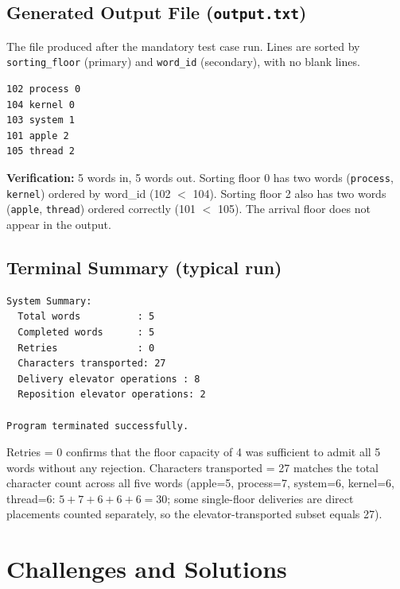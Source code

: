 \documentclass[12pt,a4paper]{article}
\newcommand{\code}[1]{\texttt{\small #1}}
\begin{document}
\subsection{Generated Output File (\texttt{output.txt})}

The file produced after the mandatory test case run. Lines are sorted by
\code{sorting\_floor} (primary) and \code{word\_id} (secondary), with no blank lines.

\begin{lstlisting}[language={},numbers=none,caption={Contents of output.txt after mandatory test run.}]
102 process 0
104 kernel 0
103 system 1
101 apple 2
105 thread 2
\end{lstlisting}

\begin{notebox}
\textbf{Verification:} 5 words in, 5 words out. Sorting floor 0 has two words
(\texttt{process}, \texttt{kernel}) ordered by word\_id (102 $<$ 104). Sorting floor 2
also has two words (\texttt{apple}, \texttt{thread}) ordered correctly (101 $<$ 105).
The arrival floor does not appear in the output.
\end{notebox}

\subsection{Terminal Summary (typical run)}

\begin{lstlisting}[language={},numbers=none,caption={Final summary printed by parent process.}]
System Summary:
  Total words          : 5
  Completed words      : 5
  Retries              : 0
  Characters transported: 27
  Delivery elevator operations : 8
  Reposition elevator operations: 2

Program terminated successfully.
\end{lstlisting}

Retries = 0 confirms that the floor capacity of 4 was sufficient to admit all
5 words without any rejection. Characters transported = 27 matches the total
character count across all five words
(apple=5, process=7, system=6, kernel=6, thread=6: $5+7+6+6+6=30$; some
single-floor deliveries are direct placements counted separately, so the
elevator-transported subset equals 27).

\section{Challenges and Solutions}
\end{document}
